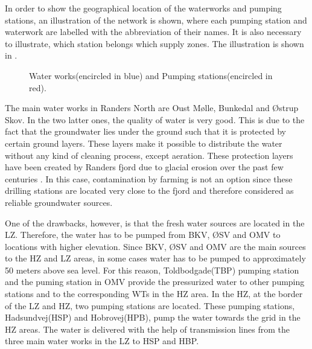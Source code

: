 In order to show the geographical location of the waterworks and pumping stations, an illustration of the network is shown, where each pumping station and waterwork are labelled with the abbreviation of their names. It is also necessary to illustrate, which station belongs which supply zones. The illustration is shown in .

\vspace{-5mm}

\begin{figure}[H]
\centering
 
\caption{Water works(encircled in blue) and Pumping stations(encircled in red).}
\vspace{-3mm}
\label{fig:pumping_stations_and_waterworks}
\end{figure}

The main water works in Randers North are Oust Mølle, Bunkedal and Østrup Skov. In the two latter ones, the quality of water is very good. This is due to the fact that the groundwater lies under the ground such that it is protected by certain ground layers. These layers make it possible to distribute the water without any kind of cleaning process, except aeration. These protection layers have been created by Randers fjord due to glacial erosion over the past few centuries \cite{geological1909water}. In this case, contamination by farming is not an option since these drilling stations are located very close to the fjord and therefore considered as reliable groundwater sources. 

One of the drawbacks, however, is that the fresh water sources are located in the LZ. Therefore, the water has to be pumped from BKV, ØSV and OMV to locations with higher elevation. Since BKV, ØSV and OMV are the main sources to the HZ and LZ areas, in some cases water has to be pumped to approximately 50 meters above sea level. For this reason, Toldbodgade(TBP) pumping station and the puming station in OMV provide the pressurized water to other pumping stations and to the corresponding WTs in the HZ area. In the HZ, at the border of the LZ and HZ, two pumping stations are located. These pumping stations, Hadsundvej(HSP) and Hobrovej(HPB), pump the water towards the grid in the HZ areas. The water is delivered with the help of transmission lines from the three main water works in the LZ to HSP and HBP. 

